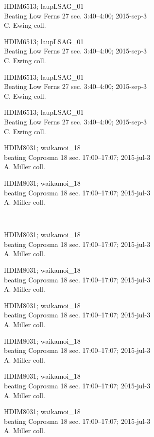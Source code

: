 \documentclass[2pt]{extarticle}
\begin{document}
\noindent
\parbox{0.16\textwidth}{\tiny \raggedright \rule[-0.3\baselineskip]{0pt}{10pt}HDIM6513; laupLSAG\_01\\ Beating Low Ferns 27 sec. 3:40--4:00; 2015-sep-3\\ C. Ewing coll.}
\parbox{0.16\textwidth}{\tiny \raggedright \rule[-0.3\baselineskip]{0pt}{10pt}HDIM6513; laupLSAG\_01\\ Beating Low Ferns 27 sec. 3:40--4:00; 2015-sep-3\\ C. Ewing coll.}
\parbox{0.16\textwidth}{\tiny \raggedright \rule[-0.3\baselineskip]{0pt}{10pt}HDIM6513; laupLSAG\_01\\ Beating Low Ferns 27 sec. 3:40--4:00; 2015-sep-3\\ C. Ewing coll.}
\parbox{0.16\textwidth}{\tiny \raggedright \rule[-0.3\baselineskip]{0pt}{10pt}HDIM6513; laupLSAG\_01\\ Beating Low Ferns 27 sec. 3:40--4:00; 2015-sep-3\\ C. Ewing coll.}
\parbox{0.16\textwidth}{\tiny \raggedright \rule[-0.3\baselineskip]{0pt}{10pt}HDIM8031; waikamoi\_18\\ beating Coprosma 18 sec. 17:00--17:07; 2015-jul-3\\ A. Miller coll.}
\parbox{0.16\textwidth}{\tiny \raggedright \rule[-0.3\baselineskip]{0pt}{10pt}HDIM8031; waikamoi\_18\\ beating Coprosma 18 sec. 17:00--17:07; 2015-jul-3\\ A. Miller coll.} \\ 
\vspace{0.001in} 

\noindent
\parbox{0.16\textwidth}{\tiny \raggedright \rule[-0.3\baselineskip]{0pt}{10pt}HDIM8031; waikamoi\_18\\ beating Coprosma 18 sec. 17:00--17:07; 2015-jul-3\\ A. Miller coll.}
\parbox{0.16\textwidth}{\tiny \raggedright \rule[-0.3\baselineskip]{0pt}{10pt}HDIM8031; waikamoi\_18\\ beating Coprosma 18 sec. 17:00--17:07; 2015-jul-3\\ A. Miller coll.}
\parbox{0.16\textwidth}{\tiny \raggedright \rule[-0.3\baselineskip]{0pt}{10pt}HDIM8031; waikamoi\_18\\ beating Coprosma 18 sec. 17:00--17:07; 2015-jul-3\\ A. Miller coll.}
\parbox{0.16\textwidth}{\tiny \raggedright \rule[-0.3\baselineskip]{0pt}{10pt}HDIM8031; waikamoi\_18\\ beating Coprosma 18 sec. 17:00--17:07; 2015-jul-3\\ A. Miller coll.}
\parbox{0.16\textwidth}{\tiny \raggedright \rule[-0.3\baselineskip]{0pt}{10pt}HDIM8031; waikamoi\_18\\ beating Coprosma 18 sec. 17:00--17:07; 2015-jul-3\\ A. Miller coll.}
\parbox{0.16\textwidth}{\tiny \raggedright \rule[-0.3\baselineskip]{0pt}{10pt}HDIM8031; waikamoi\_18\\ beating Coprosma 18 sec. 17:00--17:07; 2015-jul-3\\ A. Miller coll.} \\ 
\vspace{0.001in} 
\end{document}

